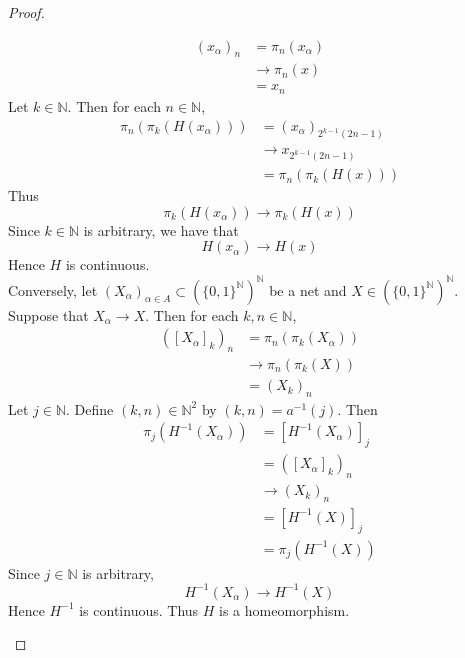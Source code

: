 \documentclass{book}
\theoremstyle{definition}
\newcommand{\al}{\alpha}
\newcommand{\N}{\mathbb{N}}
\DeclareMathOperator*{\0}{\mbf{0}}
\DeclareMathOperator*{\1}{\mbf{1}}
\begin{document}
\begin{proof}
\begin{enumerate}
			\begin{align*}
				(x_{\al})_n
				& = \pi_n(x_{\al}) \\
				& \rightarrow \pi_n(x) \\
				& = x_n 
			\end{align*}
			Let $k \in \N$. Then for each $n \in \N$,
			\begin{align*}
				\pi_{n}(\pi_k(H(x_{\al})))
				& = (x_{\al})_{ 2^{k-1}(2n -1)} \\
				& \rightarrow x_{2^{k-1}(2n -1)} \\
				& = \pi_n(\pi_k(H(x)))
			\end{align*}
			Thus 
			$$\pi_k(H(x_{\al})) \rightarrow \pi_k(H(x))$$
			Since $k \in \N$ is arbitrary, we have that 
			$$H(x_{\al}) \rightarrow H(x)$$
			Hence $H$ is continuous. \\
			Conversely, let $(X_{\al})_{\al \in A} \subset (\{0,1\}^{\N})^{\N}$ be a net and $X \in (\{0,1\}^{\N})^{\N}$. Suppose that $X_{\al} \rightarrow X$. Then for each $k, n \in \N$, 
			\begin{align*}
				([X_{\al}]_k)_n  
				& = \pi_n(\pi_k(X_{\al})) \\
				& \rightarrow \pi_n(\pi_k(X)) \\ 
				& = (X_k)_n
			\end{align*}
			Let $j \in \N$. Define $(k,n) \in \N^2$ by $(k,n) = a^{-1}(j)$. Then 
			\begin{align*}
				\pi_j(H^{-1}(X_{\al}))
				& = [H^{-1}(X_{\al})]_j \\
				& = ([X_{\al}]_k)_n \\
				& \rightarrow (X_k)_n \\
				& = [H^{-1}(X)]_j \\
				& = \pi_j(H^{-1}(X))
			\end{align*}
		Since $j \in \N$ is arbitrary, 
		$$H^{-1}(X_{\al}) \rightarrow H^{-1}(X)$$
		Hence $H^{-1}$ is continuous. Thus $H$ is a homeomorphism.
		\end{enumerate}
	\end{proof}
		
	
	
	
	
	
	
	
	
	
	
	
	
	
	
	
	
	
	
	
	
	
	
\end{document}
